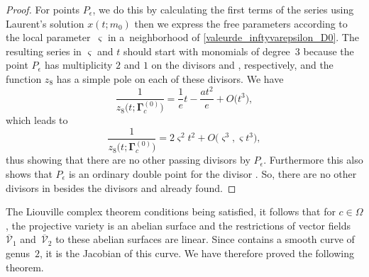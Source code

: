 \documentclass[pdftex]{sigma}
\numberwithin{equation}{section}
\begin{document}
\begin{proof}
For points $P_{\epsilon}$, we do this by calculating
 the first terms of the series  using Laurent's solution $x(t;m_0)$ then we express the free parameters according to the local parameter~$\varsigma$ in a~neighborhood of \eqref{valeurde_inftyvarepsilon_D0}. The resulting series in $\varsigma$ and $t$ should
 start with monomials of degree~$3$ because the point $P_{\epsilon}$ has multiplicity $2$ and $1$ on the divisors  and , respectively, and the function $z_{8}$ has a simple pole on each of these divisors. We have
 \[
 \frac{1}{z_{8}\bigl(t;\mathbf{\Gamma}_c^{(0)}\bigr)}=\frac{1}{e}t-\frac{at^2}{e} + O\bigl(t^3\bigr),
 \]
 which leads to
 \[
 \frac{1}{z_{8}\bigl(t;\mathbf{\Gamma}_c^{(0)}\bigr)}=2\varsigma^2 t^ 2+O\bigl(\varsigma^3,\varsigma t^3\bigr),
 \] thus showing that there are no other passing divisors
 by $P_{\epsilon}$. Furthermore this also shows that $P_{\epsilon}$
 is an ordinary double point for the divisor . So, there are no other divisors in  besides the divisors  and
  already found.
\end{proof}

 The Liouville complex theorem conditions being
 satisfied, it follows that for $c\in \Omega$, the
 projective variety  is an abelian surface and the restrictions of vector fields~$\overline{\mathcal{V}}_1$
 and~$\overline{\mathcal{V}}_2$ to these abelian surfaces are linear.
 Since  contains a smooth curve of genus~$2$, it is the Jacobian of this curve.
 We have therefore proved the following theorem.
\end{document}
